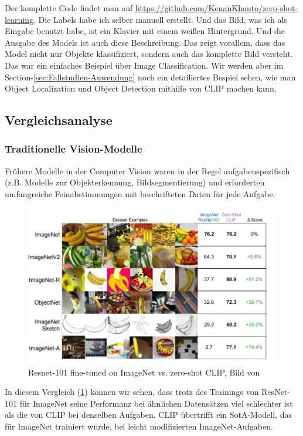 \documentclass[nolibertine, ngerman, algorithm, nomencl, minted]{ttlab-qualify}
\begin{document}
Der komplette Code findet man auf \url{https://github.com/KenanKhauto/zero-shot-learning}.
Die Labels habe ich selber manuell erstellt.
Und das Bild, was ich als Eingabe benutzt habe, ist ein Klavier mit einem weißen Hintergrund. Und die Ausgabe des Models ist auch diese Beschreibung.
Das zeigt vorallem, dass das Model nicht nur Objekte klassifiziert, sondern auch das komplette Bild versteht.
Das war ein einfaches Beispiel über Image Classification. Wir werden aber im Section-\ref{sec:Fallstudien-Anwendung} 
noch ein detailiertes Bespiel sehen, wie man Object Localization und Object Detection mithilfe von 
CLIP machen kann.
\subsection{Vergleichsanalyse}

\subsubsection{Traditionelle Vision-Modelle}
Frühere Modelle in der Computer Vision waren in der Regel aufgabenspezifisch (z.B. Modelle zur Objekterkennung, Bildsegmentierung) und erforderten umfangreiche Feinabstimmungen mit beschrifteten Daten für jede Aufgabe.
\begin{figure}[h]
	\centering
	\includegraphics[scale=0.5]{static/resnet_vs_clip.png}
	\caption{Resnet-101 fine-tuned on ImageNet vs. zero-shot CLIP, Bild von \textcite{radford2021learning}}
	\label{fig:2.5}
\end{figure}

In diesem Vergleich (\ref{fig:2.5}) können wir sehen, dass trotz des Trainings von ResNet-101 für ImageNet seine Performanz bei 
ähnlichen Datensätzen viel schlechter ist als die von CLIP bei denselben Aufgaben. CLIP übertrifft ein SotA-Modell, 
das für ImageNet trainiert wurde, bei leicht modifizierten ImageNet-Aufgaben.
\end{document}

